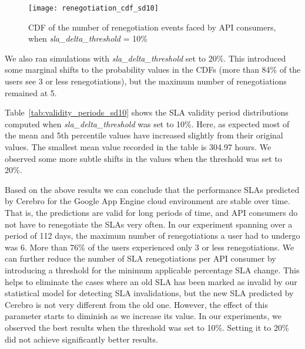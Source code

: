 \begin{figure}
\centering
\texttt{[image: renegotiation\_cdf\_sd10]}
\caption{CDF of the number of renegotiation events faced by API consumers, when  \textit{sla\_delta\_threshold} = 10\%}
\label{fig:renegotiation_cdf_sd10}
\vspace{-0.2in}
\end{figure}

We also ran simulations with \textit{sla\_delta\_threshold} set to 20\%. This introduced some marginal 
shifts to the probability values in the CDFs (more than 84\% of the users see 3 or less renegotiations), 
but the maximum number of renegotiations remained at 5.

Table~\ref{tab:validity_periods_sd10} shows the SLA validity period distributions computed
when  \textit{sla\_delta\_threshold} was set to 10\%. Here, as expected  most of the mean and 5th
percentile values have increased slightly from their original values. The smallest mean value
recorded in the table is 304.97 hours. We observed some more subtle shifts in the values
when the threshold was set to 20\%.

Based on the above results we can conclude that the performance SLAs predicted by Cerebro 
for the Google App Engine cloud environment are stable over time. That is, the predictions are 
valid for long periods of time, and API consumers do not have to renegotiate the SLAs very 
often. In our experiment spanning over a period of 112
days, the maximum number of renegotiations a user had to undergo was 6. More than 76\% of
the users experienced only 3 or less renegotiations. We can further reduce the number of 
SLA renegotiations per API consumer by introducing a threshold for the minimum applicable
percentage SLA change. This helps to eliminate the cases where an old SLA has been marked as invalid
by our statistical model for detecting SLA invalidations, but the new SLA predicted by Cerebro is not
very different from the old one. However, the effect of this parameter starts to diminish as we
increase its value. In our experiments, we observed the best results when the threshold was
set to 10\%. Setting it to 20\% did not achieve significantly better results.